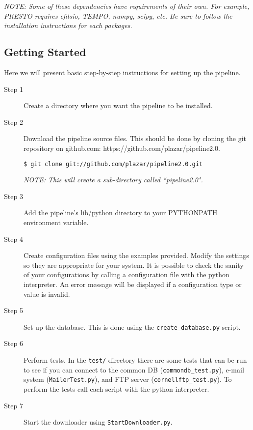 \textit{NOTE: Some of these dependencies have requirements of their own. For example, PRESTO requires cfitsio, TEMPO, numpy, scipy, etc. Be sure to follow the installation instructions for each packages.}

\subsection{Getting Started}
Here we will present basic step-by-step instructions for setting up the pipeline.

\begin{description}
    \item[Step 1] Create a directory where you want the pipeline to be installed.

    \item[Step 2] Download the pipeline source files. This should be done by cloning the git repository on github.com: https://github.com/plazar/pipeline2.0.

        \smallskip

        \texttt{\$ git clone git://github.com/plazar/pipeline2.0.git}

        \smallskip
        
        \textit{NOTE: This will create a sub-directory called ``pipeline2.0".} 

    \item[Step 3] Add the pipeline's lib/python directory to your PYTHONPATH environment variable. 

    \item[Step 4] Create configuration files using the examples provided. Modify the settings so they are appropriate for your system. It is possible to check the sanity of your configurations by calling a configuration file with the python interpreter. An error message will be displayed if a configuration type or value is invalid.  

    \item[Step 5] Set up the database. This is done using the \texttt{create\_database.py} script.

    \item[Step 6] Perform tests. In the \texttt{test/} directory there are some tests that can be run to see if you can connect to the common DB (\texttt{commondb\_test.py}), e-mail system (\texttt{MailerTest.py}), and FTP server (\texttt{cornellftp\_test.py}). To perform the tests call each script with the python interpreter.

    \item[Step 7] Start the downloader using \texttt{StartDownloader.py}.
        

\end{description}
